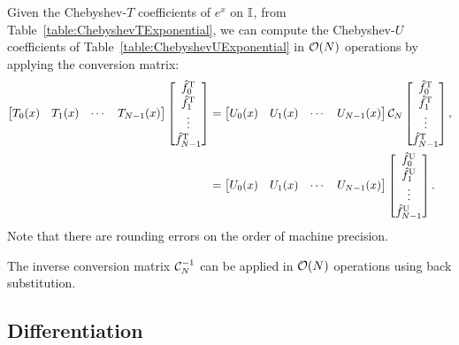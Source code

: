 \begin{example}
Given the Chebyshev-$T$ coefficients of $e^x$ on $\mathbb{I}$, from Table~\ref{table:ChebyshevTExponential}, we can compute the Chebyshev-$U$ coefficients of Table~\ref{table:ChebyshevUExponential} in $\mathcal{O}(N)$ operations by applying the conversion matrix:
\begin{align}
\begin{bmatrix} T_0(x) & T_1(x) & \cdots & T_{N-1}(x)\\\end{bmatrix}\begin{bmatrix}\hat{f}_0^{\rm T}\\\hat{f}_1^{\rm T}\\\vdots\\\hat{f}_{N-1}^{\rm T}\end{bmatrix} & = \begin{bmatrix} U_0(x) & U_1(x) & \cdots & U_{N-1}(x)\\\end{bmatrix}\mathcal{C}_N\begin{bmatrix}\hat{f}_0^{\rm T}\\\hat{f}_1^{\rm T}\\\vdots\\\hat{f}_{N-1}^{\rm T}\end{bmatrix},\\
& = \begin{bmatrix} U_0(x) & U_1(x) & \cdots & U_{N-1}(x)\\\end{bmatrix}\begin{bmatrix}\hat{f}_0^{\rm U}\\\hat{f}_1^{\rm U}\\\vdots\\\hat{f}_{N-1}^{\rm U}\end{bmatrix}.
\end{align}
Note that there are rounding errors on the order of machine precision.
\end{example}

\begin{remark}
The inverse conversion matrix $\mathcal{C}_N^{-1}$ can be applied in $\mathcal{O}(N)$ operations using back substitution.
\end{remark}

\subsection{Differentiation}

